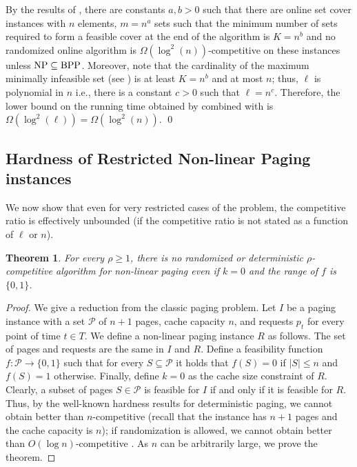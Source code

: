 \documentclass[11pt]{article}
\newcommand{\cP}{{\mathcal{P}}}
\newtheorem{theorem}[thm]{Theorem}
\begin{document}
{By the results of \cite{korman2004use}, there are constants $a,b>0$ such that there are online set cover instances with $n$ elements, $m = n^a$ sets such that the minimum number of sets required to form a feasible cover at the end of the algorithm is $K = n^b$ and no randomized online algorithm is $\Omega(\log^2\left(n\right))$-competitive on these instances unless $\textnormal{NP}\subseteq \textnormal{BPP}$. Moreover, note that the cardinality of the maximum minimally infeasible set (see ) is at least $K = n^b$ and at most $n$; thus, $\ell$ is polynomial in $n$ i.e., there is a constant $c>0$ such that $\ell = n^c$. Therefore, the lower bound on the running time obtained by  combined with \cite{korman2004use} is $\Omega(\log^2\left(\ell\right)) = \Omega(\log^2\left(n\right))$. \qed


\subsection{Hardness of Restricted Non-linear Paging instances}
\label{sec:hardRestricted}

We now show that even for very restricted cases of the problem, the competitive ratio is effectively unbounded (if the competitive ratio is not stated as a function of $\ell$ or $n$). 

\begin{theorem}
\label{thm:HardnessRestricted}
For every $\rho \geq 1$, there is no randomized or deterministic $\rho$-competitive algorithm for \textnormal{non-linear paging} even if $k = 0$ and the range of $f$ is $\{0,1\}$.
\end{theorem}

\begin{proof}
We give a reduction from the classic paging problem. Let $I$ be a paging instance with a set $\cP$ of $n+1$ pages, cache capacity $n$, and requests $p_t$ for every point of time $t \in T$. We define a non-linear paging instance $R$ as follows. The set of pages and requests are the same in $I$ and $R$. Define a feasibility function $f:\cP \rightarrow \{0,1\}$ such that for every $S \subseteq \cP$ it holds that $f(S) = 0$ if $|S| \leq n$ and $f(S) = 1$ otherwise. Finally, define $k = 0$ as the cache size constraint of $R$. Clearly, a subset of pages $S \in \cP$ is feasible for $I$ if and only if it is feasible for $R$. Thus, by the well-known hardness results for deterministic paging, we cannot obtain better than $n$-competitive \cite{sleator1985amortized} (recall that the instance has $n+1$ pages and the cache capacity is $n$); if randomization is allowed, we cannot obtain better than $O(\log n)$-competitive \cite{fiat1991competitive}. As $n$ can be arbitrarily large, we prove the theorem.  
\end{proof}
}
\end{document}
